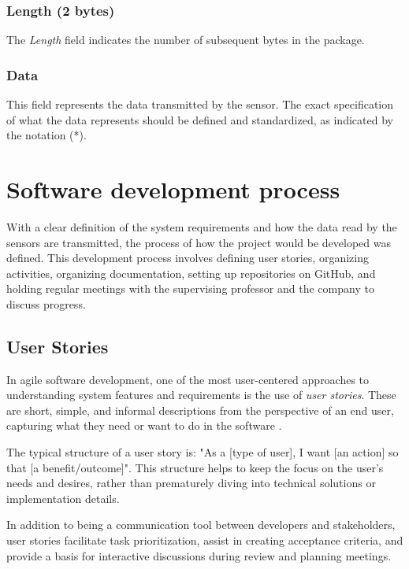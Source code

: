 \subsubsection{Length (2 bytes)}

The \textit{Length} field indicates the number of subsequent bytes in the package.

\subsubsection{Data}

This field represents the data transmitted by the sensor. The exact specification of what the data represents should be defined and standardized, as indicated by the notation (*).


\section[Software development process]{Software development process}
With a clear definition of the system requirements and how the data read by the sensors are transmitted, the process of how the project would be developed was defined. This development process involves defining user stories, organizing activities, organizing documentation, setting up repositories on GitHub, and holding regular meetings with the supervising professor and the company to discuss progress.

\subsection{User Stories}
In agile software development, one of the most user-centered approaches to understanding system features and requirements is the use of \textit{user stories}. These are short, simple, and informal descriptions from the perspective of an end user, capturing what they need or want to do in the software \cite{lucassen2015forging}.

The typical structure of a user story is: "As a [type of user], I want [an action] so that [a benefit/outcome]". This structure helps to keep the focus on the user's needs and desires, rather than prematurely diving into technical solutions or implementation details.

In addition to being a communication tool between developers and stakeholders, user stories facilitate task prioritization, assist in creating acceptance criteria, and provide a basis for interactive discussions during review and planning meetings.


